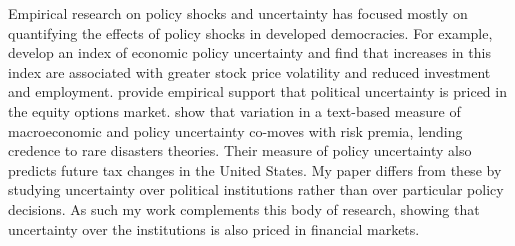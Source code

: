 Empirical research on policy shocks and uncertainty has focused mostly on quantifying the effects of policy shocks in developed democracies. For example,  \cite*{Baker2016} develop an index of economic policy uncertainty and find that increases in this index are associated with greater stock price volatility and reduced investment and employment.  \cite*{Kelly2016} provide empirical support that political uncertainty is priced in the equity options market.  \cite*{Manela2017} show that variation in a text-based measure of macroeconomic and policy uncertainty co-moves with risk premia, lending credence to rare disasters theories.  Their measure of policy uncertainty also predicts future tax changes in the United States.
My paper differs from these by studying uncertainty over political institutions rather than over particular policy decisions. As such my work complements this body of research, showing that uncertainty over the institutions is also priced in financial markets.